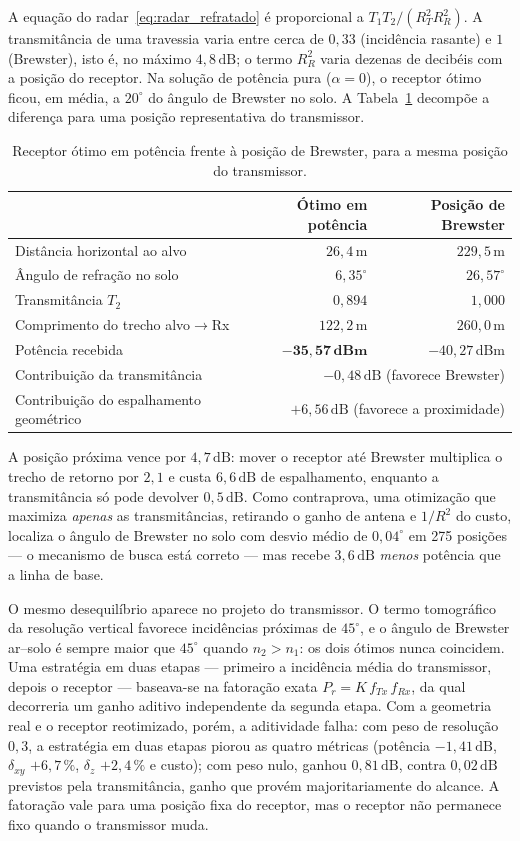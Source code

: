 \documentclass[12pt,a4paper,oneside]{book}
\theoremstyle{remark}
\newcommand{\dB}{\,\mathrm{dB}}
\theoremstyle{plain}
\theoremstyle{definition}
\begin{document}
A equação do radar~\eqref{eq:radar_refratado} é proporcional a
$T_1T_2/(R_T^2R_R^2)$. A transmitância de uma travessia varia entre cerca de
$0,33$ (incidência rasante) e $1$ (Brewster), isto é, no máximo $4,8\dB$; o termo
$R_R^2$ varia dezenas de decibéis com a posição do receptor. Na solução de
potência pura ($\alpha=0$), o receptor ótimo ficou, em média, a $20^\circ$ do
ângulo de Brewster no solo. A Tabela~\ref{tab:brewster_vs_alcance} decompõe a
diferença para uma posição representativa do transmissor.

\begin{table}[H]
\centering
\caption{Receptor ótimo em potência frente à posição de Brewster, para a mesma
posição do transmissor.}
\label{tab:brewster_vs_alcance}
\begin{tabular}{@{}lrr@{}}
\toprule
& Ótimo em potência & Posição de Brewster \\
\midrule
Distância horizontal ao alvo & $26,4\,$m & $229,5\,$m \\
Ângulo de refração no solo & $6,35^\circ$ & $26,57^\circ$ \\
Transmitância $T_2$ & $0,894$ & $1,000$ \\
Comprimento do trecho alvo$\to$Rx & $122,2\,$m & $260,0\,$m \\
Potência recebida & $\mathbf{-35,57\,dBm}$ & $-40,27\,$dBm \\
\midrule
Contribuição da transmitância & \multicolumn{2}{r}{$-0,48\dB$ (favorece Brewster)} \\
Contribuição do espalhamento geométrico & \multicolumn{2}{r}{$+6,56\dB$ (favorece a proximidade)} \\
\bottomrule
\end{tabular}
\end{table}

A posição próxima vence por $4,7\dB$: mover o receptor até Brewster multiplica o
trecho de retorno por $2,1$ e custa $6,6\dB$ de espalhamento, enquanto a
transmitância só pode devolver $0,5\dB$. Como contraprova, uma otimização que
maximiza \emph{apenas} as transmitâncias, retirando o ganho de antena e
$1/R^2$ do custo, localiza o ângulo de Brewster no solo com desvio médio de
$0,04^\circ$ em 275 posições --- o mecanismo de busca está correto --- mas
recebe $3,6\dB$ \emph{menos} potência que a linha de base.

O mesmo desequilíbrio aparece no projeto do transmissor. O termo tomográfico da
resolução vertical favorece incidências próximas de $45^\circ$, e o ângulo de
Brewster ar--solo é sempre maior que $45^\circ$ quando $n_2>n_1$: os dois
ótimos nunca coincidem. Uma estratégia em duas etapas --- primeiro a incidência
média do transmissor, depois o receptor --- baseava-se na fatoração exata
$P_r=K\,f_{Tx}\,f_{Rx}$, da qual decorreria um ganho aditivo independente da
segunda etapa. Com a geometria real e o receptor reotimizado, porém, a
aditividade falha: com peso de resolução $0,3$, a estratégia em duas etapas
piorou as quatro métricas (potência $-1,41\dB$, $\delta_{xy}$ $+6,7\,\%$,
$\delta_z$ $+2,4\,\%$ e custo); com peso nulo, ganhou $0,81\dB$, contra
$0,02\dB$ previstos pela transmitância, ganho que provém majoritariamente do
alcance. A fatoração vale para uma posição fixa do receptor, mas o receptor não
permanece fixo quando o transmissor muda.
\end{document}
